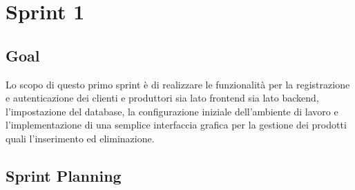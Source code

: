 \hrulefill 
\section{Sprint 1}

\subsection{Goal}
Lo scopo di questo primo sprint è di realizzare le funzionalità per la registrazione e autenticazione dei clienti e produttori sia lato frontend sia lato backend, l'impostazione del database, la configurazione iniziale dell'ambiente di lavoro e l'implementazione di una semplice interfaccia grafica per la gestione dei prodotti quali l'inserimento ed eliminazione.

\subsection{Sprint Planning}


\vspace{-1cm}

